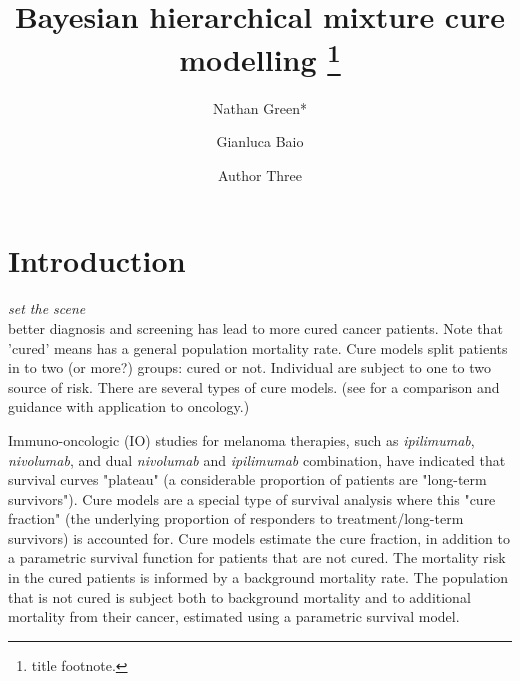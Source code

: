 \documentclass[AMA,STIX1COL]{WileyNJD-v2}
\begin{document}
\title{Bayesian hierarchical mixture cure modelling \protect\thanks{title footnote.}}

\author[1]{Nathan Green*}

\author[2,3]{Gianluca Baio}

\author[3]{Author Three}


\address[1]{, , }

\address[2]{, , }

\address[3]{, , }


\presentaddress{}




\maketitle



\section{Introduction}\label{sec:intro}

{\it set the scene}\\
better diagnosis and screening has lead to more cured cancer patients.
Note that 'cured' means has a general population mortality rate.
Cure models split patients in to two (or more?) groups: cured or not.
Individual are subject to one to two source of risk.
There are several types of cure models.
(see \cite{Yu2013} for a comparison and guidance with application to oncology.)


Immuno-oncologic (IO) studies for melanoma therapies, such as {\it ipilimumab}, {\it nivolumab}, and dual {\it nivolumab} and {\it ipilimumab} combination,
have indicated that survival curves "plateau" (a considerable proportion of patients are "long-term survivors").
Cure models are a special type of survival analysis where this "cure fraction" (the underlying proportion of responders to treatment/long-term survivors) is accounted for.
Cure models estimate the cure fraction, in addition to a parametric survival function for patients that are not cured.
The mortality risk in the cured patients is informed by a background mortality rate.
The population that is not cured is subject both to background mortality and to additional mortality from their cancer, estimated using a parametric survival model.
\cite{Amico2018}
\end{document}
